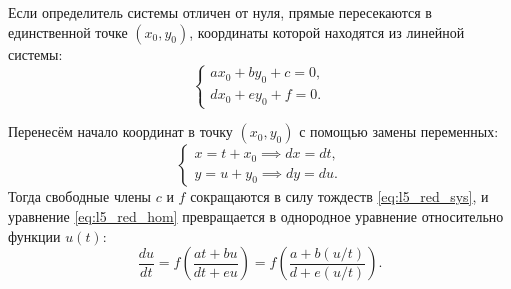 Если определитель системы отличен от нуля, прямые пересекаются в единственной
точке $(x_0, y_0)$, координаты которой находятся из линейной системы:
\begin{equation} \label{eq:l5_red_sys}
    \begin{cases}
        a x_0 + b y_0 + c = 0, \\
        d x_0 + e y_0 + f = 0.
    \end{cases} \tag{9}
\end{equation}

Перенесём начало координат в точку $(x_0, y_0)$ с помощью замены переменных:
\begin{equation} \label{eq:l5_red_subst}
    \begin{cases}
        x = t + x_0 \implies dx = dt, \\
        y = u + y_0 \implies dy = du.
    \end{cases} \tag{10}
\end{equation}
Тогда свободные члены $c$ и $f$ сокращаются в силу тождеств
\eqref{eq:l5_red_sys}, и уравнение \eqref{eq:l5_red_hom} превращается в
однородное уравнение относительно функции $u(t)$:
\[
    \frac{du}{dt} = f\left(\frac{a t + b u}{d t + e u}\right) =
    f\left(\frac{a + b (u/t)}{d + e (u/t)}\right).
\]

